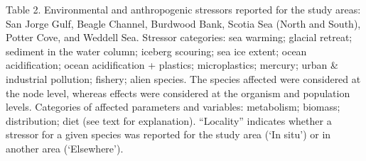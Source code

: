 \documentclass[
]{article}
\begin{document}
\newpage
\begin{landscape}
\scriptsize

Table 2. Environmental and anthropogenic stressors reported for the
study areas: San Jorge Gulf, Beagle Channel, Burdwood Bank, Scotia Sea
(North and South), Potter Cove, and Weddell Sea. Stressor categories:
sea warming; glacial retreat; sediment in the water column; iceberg
scouring; sea ice extent; ocean acidification; ocean acidification +
plastics; microplastics; mercury; urban \& industrial pollution;
fishery; alien species. The species affected were considered at the node
level, whereas effects were considered at the organism and population
levels. Categories of affected parameters and variables: metabolism;
biomass; distribution; diet (see text for explanation). ``Locality''
indicates whether a stressor for a given species was reported for the
study area (`In situ') or in another area (`Elsewhere').


\end{landscape}
\end{document}
